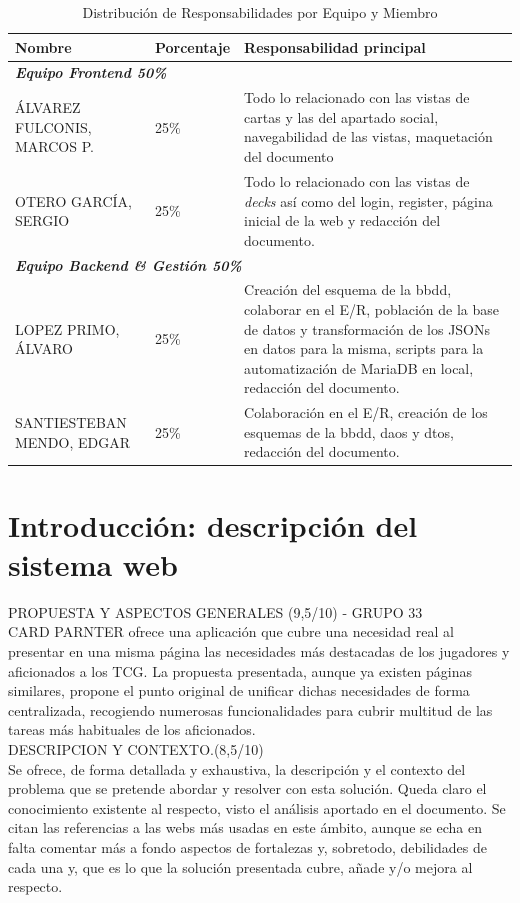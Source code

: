 \documentclass[10pt]{article}
\begin{document}
			\begin{table}[h]
				\centering
			
				\begin{tabularx}{\textwidth}{llX} 
					\toprule
					\textbf{Nombre} & \textbf{Porcentaje} & \textbf{Responsabilidad principal} \\
					\midrule
					\multicolumn{3}{l}{\textit{\textbf{Equipo Frontend 50\%}}}  \\
					\midrule
					ÁLVAREZ FULCONIS, MARCOS P. & 25\% & Todo lo relacionado con las vistas de cartas y las del apartado social, navegabilidad de las vistas, maquetación  del documento  \\
					OTERO GARCÍA, SERGIO        & 25\% & Todo lo relacionado con  las vistas de \textit{decks} así como del login, register, página inicial de la web y redacción del documento.  \\
					\midrule
					\multicolumn{3}{l}{\textit{\textbf{Equipo Backend \& Gestión 50\%}}} \\
					\midrule
					LOPEZ PRIMO, ÁLVARO         & 25\% &  Creación del esquema de la bbdd, colaborar en el E/R, población de la base de datos y transformación de los JSONs en datos para la misma, scripts para la automatización de MariaDB en local, redacción del documento. \\
					SANTIESTEBAN MENDO, EDGAR   & 25\% & Colaboración en el E/R, creación de los esquemas de la bbdd, daos y dtos, redacción del documento. \\
					\bottomrule
				\end{tabularx}
					\caption{Distribución de Responsabilidades por Equipo y Miembro}
			\end{table}
	
	
	\section{Introducción: descripción del sistema web}
		PROPUESTA Y ASPECTOS GENERALES (9,5/10) - GRUPO 33\\
		CARD PARNTER ofrece una aplicación que cubre una necesidad real al presentar en una misma página las necesidades más destacadas de los jugadores y aficionados a los TCG. La propuesta presentada, aunque ya existen páginas similares, propone el punto original de unificar dichas necesidades de forma centralizada, recogiendo numerosas funcionalidades para cubrir multitud de las tareas más habituales de los aficionados.\\
		
		DESCRIPCION Y CONTEXTO.(8,5/10)\\
		Se ofrece, de forma detallada y exhaustiva, la descripción y el contexto del problema que se pretende abordar y resolver con esta solución. Queda claro el conocimiento existente al respecto, visto el análisis aportado en el documento. Se citan las referencias a las webs más usadas en este ámbito, aunque se echa en falta comentar más a fondo aspectos de fortalezas y, sobretodo, debilidades de cada una y, que es lo que la solución presentada cubre, añade y/o mejora al respecto.\\
		
\end{document}
